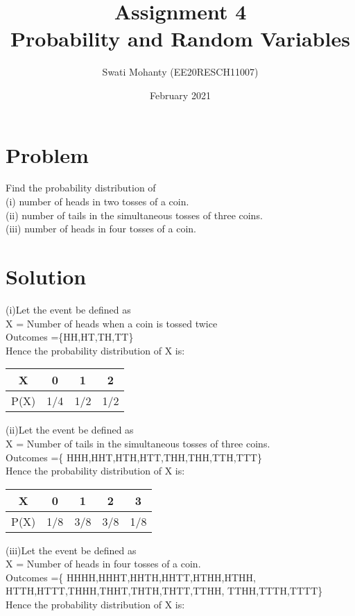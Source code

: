 \documentclass[journal,12pt,twocolumn]{IEEEtran}
\title{Assignment 4
\\Probability and Random Variables }
\author{Swati Mohanty (EE20RESCH11007) }
\date{February 2021}
\begin{document}
\maketitle


\section{Problem}
Find the probability distribution of
\\(i) number of heads in two tosses of a coin.
\\(ii) number of tails in the simultaneous tosses
of three coins.
\\(iii) number of heads in four tosses of a coin.

\section{Solution}

(i)Let the event be defined as
\\X = Number of heads when a coin is tossed twice
\\Outcomes =\{HH,HT,TH,TT\}
\\Hence the probability distribution of X is: 

\begin{center}
\begin{tabular}{ |c|c|c|c| } 
 \hline
 X & 0 & 1 & 2 \\\hline 
 P(X) & 1/4 & 1/2 & 1/2 \\ 
 \hline
\end{tabular}
\end{center}
(ii)Let the event be defined as
\\X = Number of tails in the simultaneous tosses of three coins.
\\Outcomes =\{ HHH,HHT,HTH,HTT,THH,THH,TTH,TTT\}
\\Hence the probability distribution of X is: 

\begin{center}
\begin{tabular}{ |c|c|c|c|c| } 
 \hline
 X & 0 & 1 & 2 & 3 \\ \hline
 P(X) & 1/8 & 3/8 & 3/8 & 1/8 \\ 
 \hline
\end{tabular}
\end{center}
(iii)Let the event be defined as
\\X = Number of heads in four tosses of a coin.
\\Outcomes =\{ HHHH,HHHT,HHTH,HHTT,HTHH,HTHH,
HTTH,HTTT,THHH,THHT,THTH,THTT,TTHH, TTHH,TTTH,TTTT\}
\\Hence the probability distribution of X is: 
\end{document}
